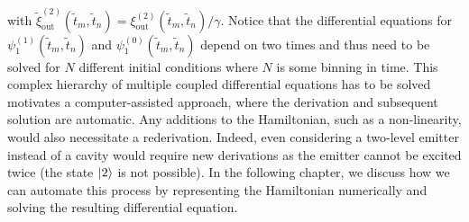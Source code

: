with $\tilde{\xi}_{\text {out }}^{(2)}\left(\tilde{t}_m, \tilde{t}_n\right) = \xi_{\text {out }}^{(2)}\left(\tilde{t}_m, \tilde{t}_n\right)/\gamma$. Notice that the differential equations for $\psi_1^{(1)}\left(\tilde{t}_m, \tilde{t}_n\right)$ and $\psi_1^{(0)}\left(\tilde{t}_m, \tilde{t}_n\right)$ depend on two times and thus need to be solved for $N$ different initial conditions where $N$ is some binning in time. This complex hierarchy of multiple coupled differential equations has to be solved motivates a computer-assisted approach, where the derivation and subsequent solution are automatic. Any additions to the Hamiltonian, such as a non-linearity, would also necessitate a rederivation. Indeed, even considering a two-level emitter instead of a cavity would require new derivations as the emitter cannot be excited twice (the state $\ket{2}$ is not possible). In the following chapter, we discuss how we can automate this process by representing the Hamiltonian numerically and solving the resulting differential equation.






